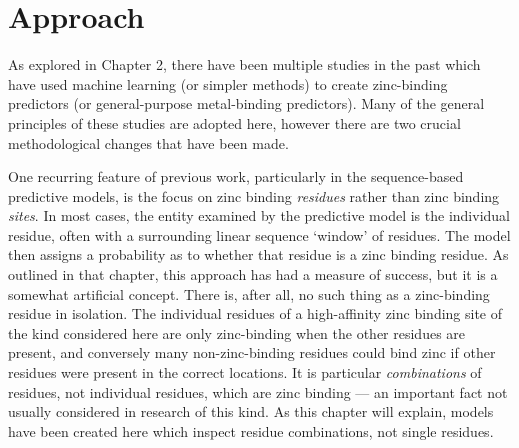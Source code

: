 \section{Approach}

As explored in Chapter 2, there have been multiple studies in the past which have used machine learning (or simpler methods) to create zinc-binding predictors (or general-purpose metal-binding predictors). Many of the general principles of these studies are adopted here, however there are two crucial methodological changes that have been made.

One recurring feature of previous work, particularly in the sequence-based predictive models, is the focus on zinc binding \emph{residues} rather than zinc binding \emph{sites}. In most cases, the entity examined by the predictive model is the individual residue, often with a surrounding linear sequence `window' of residues. The model then assigns a probability as to whether that residue is a zinc binding residue. As outlined in that chapter, this approach has had a measure of success, but it is a somewhat artificial concept. There is, after all, no such thing as a zinc-binding residue in isolation. The individual residues of a high-affinity zinc binding site of the kind considered here are only zinc-binding when the other residues are present, and conversely many non-zinc-binding residues could bind zinc if other residues were present in the correct locations. It is particular \emph{combinations} of residues, not individual residues, which are zinc binding --- an important fact not usually considered in research of this kind. As this chapter will explain, models have been created here which inspect residue combinations, not single residues.


